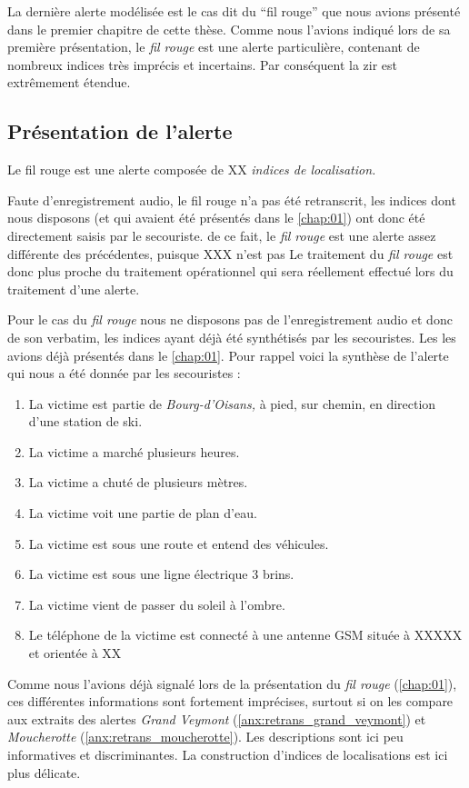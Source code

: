 
La dernière alerte modélisée est le cas dit du \enquote{fil rouge} que
nous avions présenté dans le premier chapitre de cette thèse. Comme
nous l'avions indiqué lors de sa première présentation, le \emph{fil
  rouge} est une alerte particulière, contenant de nombreux indices
très imprécis et incertains. Par conséquent la \ac{zir} est
extrêmement étendue.


\subsection{Présentation de l'alerte}
\label{subsec:9-4-1}

Le fil rouge est une alerte composée de XX \emph{indices de
  localisation.}


Faute d'enregistrement audio, le fil rouge n'a pas été retranscrit,
les indices dont nous disposons (et qui avaient été présentés dans le
\autoref{chap:01}) ont donc été directement saisis par le secouriste.
%
de ce fait, le \emph{fil rouge} est une alerte assez différente des
précédentes, puisque XXX n'est pas
%
Le traitement du \emph{fil rouge} est donc plus proche du traitement
opérationnel qui sera réellement effectué lors du traitement d'une
alerte.


Pour le cas du \emph{fil rouge} nous ne disposons pas de
l'enregistrement audio et donc de son verbatim, les indices ayant déjà 
été synthétisés par les secouristes. Les les avions déjà présentés
dans le \autoref{chap:01}.
%
Pour rappel voici la synthèse de l'alerte qui nous a été donnée par
les secouristes :
%
\begin{enumerate}
\item La victime est partie de \emph{Bourg-d'Oisans,} à pied, sur
  chemin, en direction d'une station de ski.
\item La victime a marché plusieurs heures.
\item La victime a chuté de plusieurs mètres.
\item La victime voit une partie de plan d'eau.
\item La victime est sous une route et entend des véhicules.
\item La victime est sous une ligne électrique 3 brins.
\item La victime vient de passer du soleil à l'ombre.
\item Le téléphone de la victime est connecté à une antenne GSM située
  à XXXXX et orientée à XX
\end{enumerate}

Comme nous l'avions déjà signalé lors de la présentation du \emph{fil
  rouge} (\autoref{chap:01}), ces différentes informations sont
fortement imprécises, surtout si on les compare aux extraits des
alertes \emph{Grand Veymont} (\autoref{anx:retrans_grand_veymont}) et
\emph{Moucherotte} (\autoref{anx:retrans_moucherotte}). Les
descriptions sont ici peu informatives et discriminantes. La
construction d'indices de localisations est ici plus délicate.

